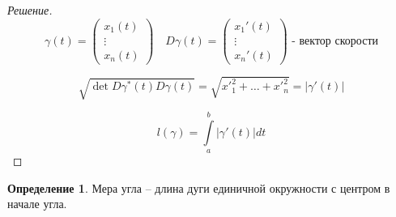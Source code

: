 \documentclass[a5paper]{article}
\newcounter{through}
\theoremstyle{plain}
\theoremstyle{definition}
\newtheorem{definition}[through]{Определение}
\numberwithin{through}{section}
\numberwithin{equation}{section}
\begin{document}
\begin{proof}[Решение]
	\begin{equation*}
	\gamma(t) = 
	\begin{pmatrix}
	x_1(t) \\
	\vdots \\
	x_n(t)
	\end{pmatrix}
	\quad	
	D \gamma(t) = 
	\begin{pmatrix}
	x_1'(t) \\
	\vdots \\
	x_n'(t)
	\end{pmatrix} 
	\text{ - вектор скорости}
	\end{equation*}
	
	\begin{equation*}
	\sqrt{\det D \gamma^* (t) D \gamma (t)} = \sqrt{{x'}_1^2 + \ldots + {x'}_n^2} = |\gamma'(t)|
	\end{equation*}
	
	\begin{equation*}
	l(\gamma) = \int\limits_{a}^{b} |\gamma'(t)|dt
	\end{equation*}
\end{proof}


\begin{definition}
	Мера угла -- длина дуги единичной окружности с центром в начале угла.
\end{definition}
\end{document}
